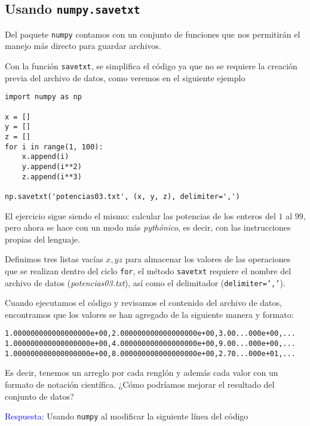 \documentclass[12pt]{article}
\begin{document}
\subsection{Usando \texttt{numpy.savetxt}}
Del paquete \texttt{numpy} contamos con un conjunto de funciones que nos permitirán el manejo más directo para guardar archivos.
\par
Con la función \texttt{savetxt}, se simplifica el código ya que no se requiere la creación previa del archivo de datos, como veremos en el siguiente ejemplo
\begin{verbatim}
import numpy as np

x = []
y = []
z = []
for i in range(1, 100):
    x.append(i)
    y.append(i**2)
    z.append(i**3)

np.savetxt('potencias03.txt', (x, y, z), delimiter=',')
\end{verbatim}
El ejercicio sigue siendo el mismo: calcular las potencias de los enteros del $1$ al $99$, pero ahora se hace con un modo más \emph{pythónico}, es decir, con las instrucciones propias del lenguaje.
\par
Definimos tres listas vacías $x, y z$ para almacenar los valores de las operaciones que se realizan dentro del ciclo \texttt{for}, el método \texttt{savetxt} requiere el nombre del archivo de datos (\emph{potencias03.txt}), así como el delimitador (\texttt{delimiter=','}).
\par
Cuando ejecutamos el código y revisamos el contenido del archivo de datos, encontramos que los valores se han agregado de la siguiente manera y formato:
\begin{verbatim}
1.000000000000000000e+00,2.000000000000000000e+00,3.00...000e+00,...
1.000000000000000000e+00,4.000000000000000000e+00,9.00...000e+00,...
1.000000000000000000e+00,8.000000000000000000e+00,2.70...000e+01,...
\end{verbatim}
Es decir, tenemos un arreglo por cada renglón y además cada valor con un formato de notación científica. ¿Cómo podríamos mejorar el resultado del conjunto de datos?
\par
\textcolor{blue}{Respuesta:} Usando \texttt{numpy} al modificar la siguiente línea del código
\end{document}
